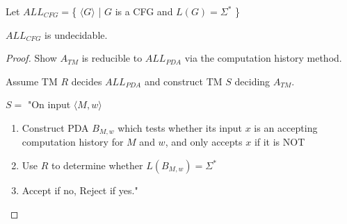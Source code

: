 \begin{theorem}
    Let \(ALL_{CFG} = \)\{ \(\langle G \rangle\) | \(G\) is a CFG and \(L(G) = \Sigma^*\)   \} 

    \(ALL_{CFG}\) is undecidable. 
\end{theorem}
\begin{proof}
    Show \(A_{TM}\) is reducible to \(ALL_{PDA}\) via the computation history method.  

    Assume TM \(R\) decides \(ALL_{PDA}\) and construct TM \(S\) deciding \(A_{TM}\).    

    \(S = \) "On input \(\langle M, w \rangle\) 
    \begin{enumerate}
        \item Construct PDA \(B_{M, w}\) which tests whether its input \(x\) is an accepting computation history for \(M\) and \(w\), and only accepts \(x\) if it is NOT
        \item Use \(R\) to determine whether \(L(B_{M, w}) = \Sigma^*\) 
        \item Accept if no, Reject if yes."      
    \end{enumerate}
\end{proof}